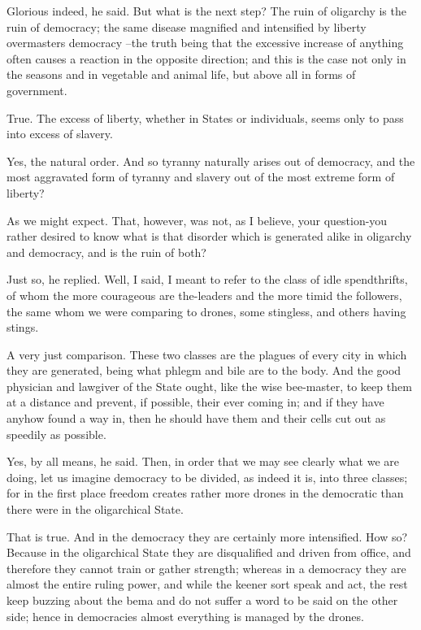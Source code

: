 Glorious indeed, he said. But what is the next step?
The ruin of oligarchy is the ruin of democracy; the same disease magnified and intensified by liberty overmasters democracy --the truth being that the excessive increase of anything often causes a reaction in the opposite direction; and this is the case not only in the seasons and in vegetable and animal life, but above all in forms of government.

True.
The excess of liberty, whether in States or individuals, seems only to pass into excess of slavery.

Yes, the natural order.
And so tyranny naturally arises out of democracy, and the most aggravated form of tyranny and slavery out of the most extreme form of liberty?

As we might expect.
That, however, was not, as I believe, your question-you rather desired to know what is that disorder which is generated alike in oligarchy and democracy, and is the ruin of both?

Just so, he replied.
Well, I said, I meant to refer to the class of idle spendthrifts, of whom the more courageous are the-leaders and the more timid the followers, the same whom we were comparing to drones, some stingless, and others having stings.

A very just comparison.
These two classes are the plagues of every city in which they are generated, being what phlegm and bile are to the body. And the good physician and lawgiver of the State ought, like the wise bee-master, to keep them at a distance and prevent, if possible, their ever coming in; and if they have anyhow found a way in, then he should have them and their cells cut out as speedily as possible.

Yes, by all means, he said.
Then, in order that we may see clearly what we are doing, let us imagine democracy to be divided, as indeed it is, into three classes; for in the first place freedom creates rather more drones in the democratic than there were in the oligarchical State.

That is true.
And in the democracy they are certainly more intensified.
How so?
Because in the oligarchical State they are disqualified and driven from office, and therefore they cannot train or gather strength; whereas in a democracy they are almost the entire ruling power, and while the keener sort speak and act, the rest keep buzzing about the bema and do not suffer a word to be said on the other side; hence in democracies almost everything is managed by the drones.

